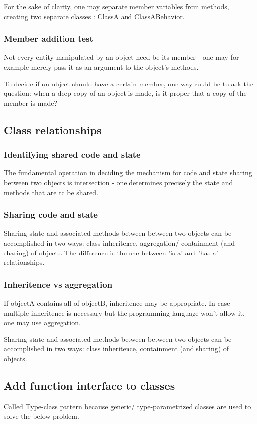 \documentclass[oneside, article]{memoir}
\begin{document}
For the sake of clarity, one may separate member variables from methods, creating two separate classes : ClassA and ClassABehavior.

\subsubsection{Member addition test}
Not every entity manipulated by an object need be its member - one may for example merely pass it as an argument to the object's methods.

To decide if an object should have a certain member, one way could be to ask the question: when a deep-copy of an object is made, is it proper that a copy of the member is made?

\subsection{Class relationships}
\subsubsection{Identifying shared code and state}
The fundamental operation in deciding the mechanism for code and state sharing between two objects is intersection - one determines precisely the state and methods that are to be shared.

\subsubsection{Sharing code and state}
Sharing state and associated methods between between two objects can be accomplished in two ways: class inheritence, aggregation/ containment (and sharing) of objects. The difference is the one between 'is-a' and 'has-a' relationships.

\subsubsection{Inheritence vs aggregation}
If objectA contains all of objectB, inheritence may be appropriate. In case multiple inheritence is necessary but the programming language won't allow it, one may use aggregation.

Sharing state and associated methods between between two objects can be accomplished in two ways: class inheritence, containment (and sharing) of objects.

\subsection{Add function interface to classes}
Called Type-class pattern because generic/ type-parametrized classes are used to solve the below problem.
\end{document}
